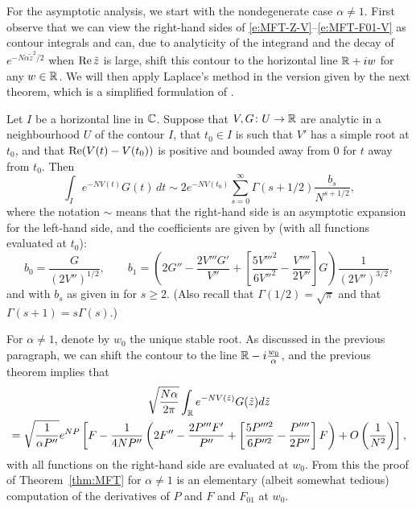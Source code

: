 \documentclass[11pt]{amsart}
\numberwithin{equation}{section}
\numberwithin{theorem}{section}
\begin{document}
For the asymptotic analysis, we start with the nondegenerate case
$\alpha \neq 1$. First
observe that we can view the right-hand sides of \eqref{e:MFT-Z-V}--\eqref{e:MFT-F01-V}
as contour integrals and can, due to analyticity of the integrand and the decay of $e^{-N\alpha\tilde z^2/2}$ when $\operatorname{Re} \tilde z$ is large,
shift this contour to the horizontal line $\mathbb{R}+iw$ for any $w\in \mathbb{R}$.
%
We will then apply Laplace's method in the version given by the next theorem,
which is a simplified formulation of \cite[Theorem~7, p.127]{MR0435697}.

\begin{theorem}
\label{thm:Laplace-interior}
Let $I$ be a horizontal line in $\mathbb{C}$. %
Suppose that $V,G\colon U \to\mathbb{R}$ are analytic in a neighbourhood $U$ of the contour $I$, that $t_0 \in I$ is such that
$V'$ has a simple root at $t_0$, %
and that $\operatorname{Re} (V(t)-V(t_0))$
is positive and bounded away from $0$ for $t$ away from $t_0$.
Then
\begin{equation}
  \label{e:Laplace-thm}
  \int_I e^{-NV(t)} G(t) \, dt
  \sim
  2e^{-NV(t_0)}
  \sum_{s=0}^\infty
  \Gamma (s+1/2) \frac{b_{s}}{N^{s+1/2}} ,
\end{equation}
where the notation $\sim$ means that the right-hand side is an asymptotic expansion for the left-hand side,
and the coefficients are given by (with all functions evaluated at $t_0$):
\begin{equation}
  \label{e:b01}
  b_0  = \frac{G}{(2 V'')^{1/2}},\qquad
  b_1 =
        \left(
        2G'' - \frac{2V'''G'}{V''}
        +
        \left[
        \frac{5V'''^2}{6V''^2} -\frac{V''''}{2V''}
        \right] G
        \right)
        \frac{1}{(2V'')^{3/2}}
        ,
\end{equation}
and with $b_{s}$ as given in \cite{MR0435697} for $s \ge 2$.
(Also recall that $\Gamma(1/2) = \sqrt{\pi}$ and that $\Gamma(s+1)=s\Gamma(s)$.)
\end{theorem}

For $\alpha\neq 1$, denote by $w_0$ the unique stable root.
As discussed in the previous paragraph, we can shift the contour to the line $\mathbb{R}-i \frac{w_0}{\alpha}$,
and the previous theorem implies that
\begin{multline} \label{e:Laplace} 
  \sqrt{\frac{N\alpha}{2\pi}}
  \int_{\mathbb{R}} e^{-NV(\tilde z)} G(\tilde z) d\tilde z
  \\
  =
  \sqrt{\frac{1}{\alpha P''}}
  e^{NP}
  \left[{
    F - \frac{1}{4NP''}
    \left(
      2F'' - \frac{2P'''F'}{P''}
      +
    \left[
      \frac{5P'''^2}{6P''^2} -\frac{P''''}{2P''}
    \right] F
  \right)
  + O\left(\frac{1}{N^{2}}\right)
  }\right],
\end{multline}
with all functions on the right-hand side are evaluated at $w_0$.
From this the proof of Theorem~\ref{thm:MFT} for $\alpha\neq 1$ is an
elementary (albeit somewhat tedious) computation of the derivatives of
$P$ and $F$ and $F_{01}$ at $w_0$.
\end{document}
